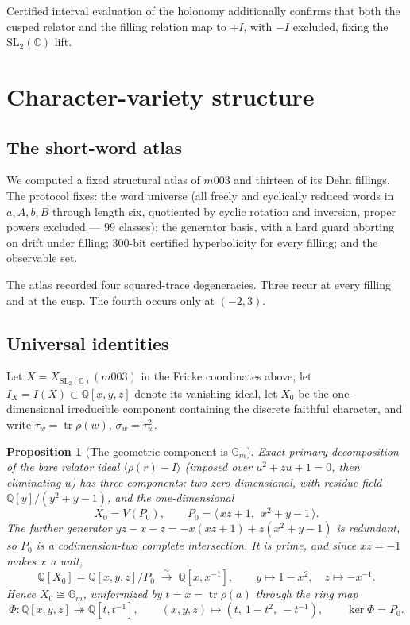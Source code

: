 \documentclass[11pt,a4paper]{article}
\newtheorem{proposition}[theorem]{Proposition}
\theoremstyle{definition}
\theoremstyle{remark}
\newcommand{\tr}{\operatorname{tr}}
\newcommand{\SLtwo}{\mathrm{SL}_2(\mathbb{C})}
\newcommand{\Q}{\mathbb{Q}}
\begin{document}
Certified interval evaluation of the holonomy additionally confirms
that both the cusped relator and the filling relation map to $+I$,
with $-I$ excluded, fixing the $\SLtwo$ lift.

\section{Character-variety structure}
\label{sec:atlas}

\subsection{The short-word atlas}

We computed a fixed structural atlas of $m003$ and thirteen of its
Dehn fillings. The
protocol fixes: the word universe (all freely and cyclically reduced
words in $a,A,b,B$ through length six, quotiented by cyclic rotation
and inversion, proper powers excluded --- $99$ classes); the
generator basis, with a hard guard aborting on drift under filling;
$300$-bit certified hyperbolicity for every filling; and the observable
set.

The atlas recorded four squared-trace degeneracies. Three recur at
every filling and at the cusp. The fourth occurs only at $(-2,3)$.

\subsection{Universal identities}

Let $X = X_{\SLtwo}(m003)$ in the Fricke coordinates above, let
$I_X = I(X) \subset \Q[x,y,z]$ denote its vanishing ideal, let $X_0$
be the one-dimensional irreducible component containing the discrete
faithful character, and write $\tau_w = \tr\rho(w)$,
$\sigma_w = \tau_w^2$.

\begin{proposition}[The geometric component is $\mathbb{G}_m$]
\label{prop:x0gm}
Exact primary decomposition of the bare relator ideal
$\langle \rho(r) - I\rangle$ (imposed over $u^2+zu+1=0$, then
eliminating $u$) has three components: two zero-dimensional, with
residue field $\Q[y]/(y^2+y-1)$, and the one-dimensional
\begin{equation}
X_0 = V(P_0), \qquad
P_0 = \langle\, xz + 1,\ \ x^2 + y - 1\,\rangle .
\end{equation}
The further generator $yz - x - z = -x(xz+1) + z(x^2+y-1)$ is
redundant, so $P_0$ is a codimension-two complete intersection. It is
prime, and since $xz = -1$ makes $x$ a unit,
\begin{equation}
\Q[X_0] = \Q[x,y,z]/P_0 \;\xrightarrow{\ \sim\ }\; \Q[x,x^{-1}],
\qquad y \longmapsto 1 - x^2, \quad z \longmapsto -x^{-1}.
\end{equation}
Hence $X_0 \cong \mathbb{G}_m$, uniformized by $t = x = \tr\rho(a)$
through the ring map
\begin{equation}
\Phi : \Q[x,y,z] \twoheadrightarrow \Q[t,t^{-1}], \qquad
(x,y,z) \longmapsto (t,\ 1-t^2,\ -t^{-1}), \qquad
\ker\Phi = P_0 .
\end{equation}
\end{proposition}
\end{document}
